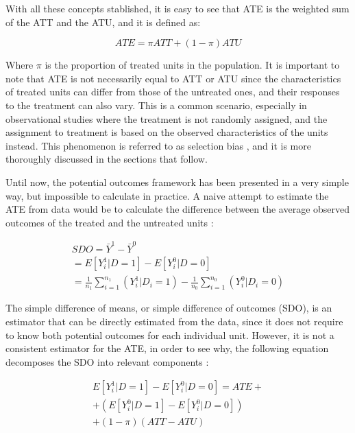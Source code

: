 With all these concepts stablished, it is easy to see that \gls{ATE} is the weighted sum of the \gls{ATT} and the \gls{ATU}, and it is defined as:

\begin{equation}
  ATE = \pi ATT + (1 - \pi)ATU
  \label{eq:ATE_ATT_ATU}
\end{equation}

Where $\pi$ is the proportion of treated units in the population. It is important to note that \gls{ATE} is not necessarily equal to \gls{ATT} or \gls{ATU} since the characteristics
of treated units can differ from those of the untreated ones, and their responses to the treatment can also vary. This is a common scenario, especially in observational studies where
the treatment is not randomly assigned, and the assignment to treatment is based on the observed characteristics of the units instead. This phenomenon is referred to as selection bias
, and it is more thoroughly discussed in the sections that follow.

Until now, the potential outcomes framework has been presented in a very simple way, but impossible to calculate in practice. A naive attempt to 
estimate the \gls{ATE} from data would be to calculate the difference between the average observed outcomes of the treated and the untreated units : 

\begin{equation}
\begin{aligned}
  SDO = \bar{Y}^1 - \bar{Y}^0 \\
  = E[Y_i^1 | D = 1] - E[Y_i^0 | D = 0] \\
  = \frac{1}{n_1}\sum_{i=1}^{n_1}(Y_i^1 | D_i = 1) - \frac{1}{n_0}\sum_{i=1}^{n_0}(Y_i^0 | D_i = 0)
  \label{eq:SDO}
\end{aligned}
\end{equation}

The simple difference of means, or simple difference of outcomes (\gls{SDO}), is an estimator that can be directly estimated from the data, since 
it does not require to know both potential outcomes for each individual unit. However, it is not a consistent estimator for the \gls{ATE},
in order to see why, the following equation decomposes the \gls{SDO} into relevant components : 

\begin{equation}
\begin{aligned}
  E[Y_i^1 | D = 1] - E[Y_i^0 | D = 0] = ATE +  \\
                                      + (E[Y_i^0 | D = 1] - E[Y_i^0 | D = 0]) \\ 
                                      + (1 - \pi)(ATT - ATU) \\ 
  \label{eq:SDO_decomposition}
\end{aligned}
\end{equation}

